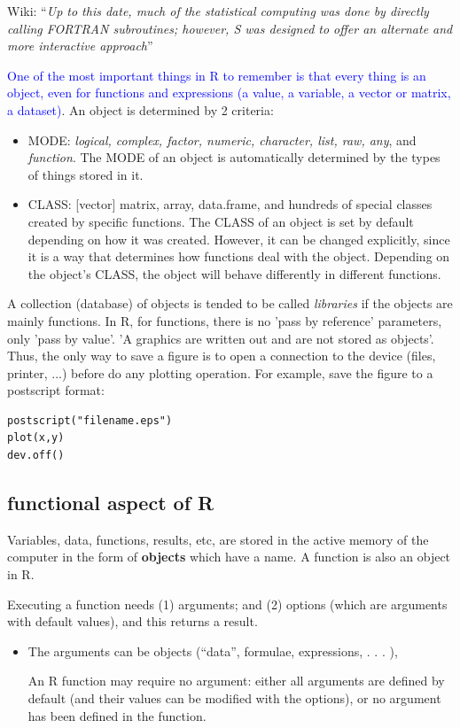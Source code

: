 Wiki: ``{\it Up to this date, much of the statistical computing was done by
directly calling FORTRAN subroutines; however, S was designed to offer
an alternate and more interactive approach}''


\textcolor{blue}{One of the most important things in R to remember is
that every thing is an object, even for functions and expressions (a
value, a variable, a vector or matrix, a dataset)}.
An object is determined by 2 criteria:

\begin{itemize}
\item MODE\label{mode}:
  {\it logical, complex, factor, numeric, character, list,
    raw, any},
  and {\it function}. The MODE of an object is automatically
  determined by the types of things stored in it.

\item CLASS\label{class}: [vector] matrix, array, data.frame, and hundreds of
  special classes created by specific functions. The CLASS of an
  object is set by default depending on how it was created. However,
  it can be changed explicitly, since it is a way that determines how
  functions deal with the object. Depending on the object's CLASS, the
  object will behave differently in different functions.

\end{itemize} 

A collection (database) of objects is tended to be called
{\it libraries} if the objects are mainly functions. In R, for
functions, there is no 'pass by reference' parameters, only 'pass by
value'.  'A graphics are written out and are not stored as
objects'. Thus, the only way to save a figure is to open a connection
to the device (files, printer, ...)  before do any plotting
operation. For example, save the figure to a postscript format:
\begin{lstlisting}
postscript("filename.eps")
plot(x,y) 
dev.off()
\end{lstlisting}


\subsection{functional aspect of R}
\label{sec:R-functional}


Variables, data, functions, results, etc, are stored in the active memory of the
computer in the form of {\bf objects} which have a name. A function is also an
object in R.

Executing a function needs (1) arguments; and (2) options (which are arguments
with default values), and this returns a result.
\begin{itemize}

  \item The arguments can be objects (“data”, formulae, expressions, . . . ),

An R function may require no argument: either all arguments are defined by
default (and their values can be modified with the options), or no argument has
been defined in the function.

\end{itemize}

